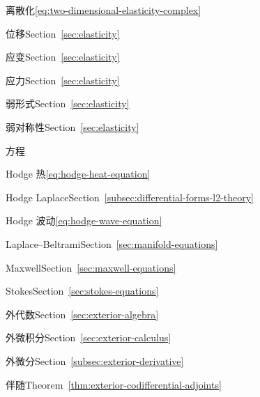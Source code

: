 \begin{theindex}
\subitem {}\label{index:elasticity-discretization}{离散化}\quad \eqref{eq:two-dimensional-elasticity-complex}

\subitem {}\label{index:elasticity-displacement}{位移}\quad Section~\ref{sec:elasticity}

\subitem {}\label{index:elasticity-strain}{应变}\quad Section~\ref{sec:elasticity}

\subitem {}\label{index:elasticity-stress}{应力}\quad Section~\ref{sec:elasticity}

\subitem {}\label{index:elasticity-weak-formulation}{弱形式}\quad Section~\ref{sec:elasticity}

\subitem {}\label{index:elasticity-weak-symmetry}{弱对称性}\quad Section~\ref{sec:elasticity}

\item {}\label{index:equation}{方程}

\subitem {}\label{index:equation-hodge-heat}{Hodge 热}\quad \eqref{eq:hodge-heat-equation}

\subitem {}\label{index:equation-hodge-laplace}{Hodge Laplace}\quad Section~\ref{subsec:differential-forms-l2-theory}

\subitem {}\label{index:equation-hodge-wave}{Hodge 波动}\quad \eqref{eq:hodge-wave-equation}

\subitem {}\label{index:equation-laplace-beltrami}{Laplace–Beltrami}\quad Section~\ref{sec:manifold-equations}

\subitem {}\label{index:equation-maxwell-s}{Maxwell}\quad Section~\ref{sec:maxwell-equations}

\subitem {}\label{index:equation-stokes}{Stokes}\quad Section~\ref{sec:stokes-equations}

\item {}\label{index:exterior-algebra}{外代数}\quad Section~\ref{sec:exterior-algebra}

\item {}\label{index:exterior-calculus}{外微积分}\quad Section~\ref{sec:exterior-calculus}

\item {}\label{index:exterior-derivative}{外微分}\quad Section~\ref{subsec:exterior-derivative}

\subitem {}\label{index:exterior-derivative-adjoint-of}{伴随}\quad Theorem~\ref{thm:exterior-codifferential-adjoints}


\end{theindex}
